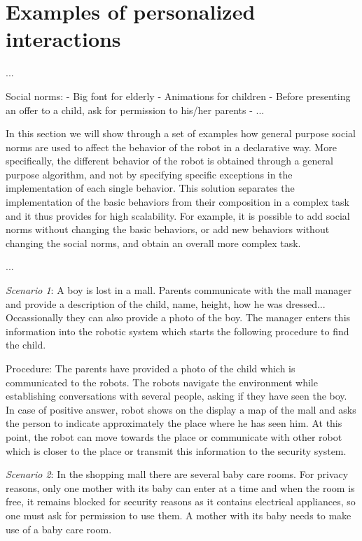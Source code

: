 \section{Examples of personalized interactions}

...

Social norms:
- Big font for elderly
- Animations for children 
- Before presenting an offer to a child, ask for permission to his/her parents
- ...


In this section we will show through a set of examples how general purpose social norms are used to affect the behavior of the robot in a declarative way. More specifically, the different behavior of the robot is obtained through a general purpose algorithm, and not by specifying specific exceptions in the implementation of each single behavior.
This solution separates the implementation of the basic behaviors from their composition in a complex task and it thus provides for high scalability. For example, it is possible to add social norms without changing the basic behaviors, or add new behaviors without changing the social norms, and obtain an overall more complex task.


...








\textit{Scenario 1}: 
A boy is lost in a mall. Parents communicate with the mall manager and provide a description of the child, name, height, how he was dressed... Occassionally they can also provide a photo of the boy. The manager enters this information into the robotic system which starts the following procedure to find the child.

Procedure: 
The parents have provided a photo of the child which is communicated to the robots. The robots navigate the environment while establishing conversations with several people, asking if they have seen the boy. In case of positive answer, robot shows on the display a map of the mall and asks the person to indicate approximately the place where he has seen him. At this point, the robot can move towards the place or communicate with other robot which is closer to the place or transmit this information to the security system.

\textit{Scenario 2}: 
In the shopping mall there are several baby care rooms. For privacy reasons, only one mother with its baby can enter at a time and when the room is free, it remains blocked for security reasons as it contains electrical appliances, so one must ask for permission to use them. 
A mother with its baby needs to make use of a baby care room.

